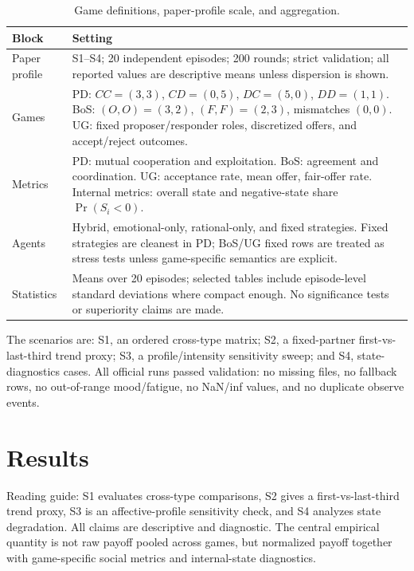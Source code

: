 \documentclass[runningheads]{llncs}
\begin{document}
\begin{table}[t]
\centering
\caption{Game definitions, paper-profile scale, and aggregation.}
\label{tab:protocol}
\scriptsize
\begin{tabular}{p{.20\linewidth}p{.70\linewidth}}
\toprule
Block & Setting \\
\midrule
Paper profile & S1--S4; 20 independent episodes; 200 rounds; strict validation; all reported values are descriptive means unless dispersion is shown. \\
Games & PD: $CC=(3,3)$, $CD=(0,5)$, $DC=(5,0)$, $DD=(1,1)$. BoS: $(O,O)=(3,2)$, $(F,F)=(2,3)$, mismatches $(0,0)$. UG: fixed proposer/responder roles, discretized offers, and accept/reject outcomes. \\
Metrics & PD: mutual cooperation and exploitation. BoS: agreement and coordination. UG: acceptance rate, mean offer, fair-offer rate. Internal metrics: overall state and negative-state share $\Pr(S_i<0)$. \\
Agents & Hybrid, emotional-only, rational-only, and fixed strategies. Fixed strategies are cleanest in PD; BoS/UG fixed rows are treated as stress tests unless game-specific semantics are explicit. \\
Statistics & Means over 20 episodes; selected tables include episode-level standard deviations where compact enough. No significance tests or superiority claims are made. \\
\bottomrule
\end{tabular}
\end{table}

The scenarios are: S1, an ordered cross-type matrix; S2, a fixed-partner first-vs-last-third trend proxy; S3, a profile/intensity sensitivity sweep; and S4, state-diagnostics cases. All official runs passed validation: no missing files, no fallback rows, no out-of-range mood/fatigue, no NaN/inf values, and no duplicate observe events.

\section{Results}
Reading guide: S1 evaluates cross-type comparisons, S2 gives a first-vs-last-third trend proxy, S3 is an affective-profile sensitivity check, and S4 analyzes state degradation. All claims are descriptive and diagnostic. The central empirical quantity is not raw payoff pooled across games, but normalized payoff together with game-specific social metrics and internal-state diagnostics.
\end{document}
